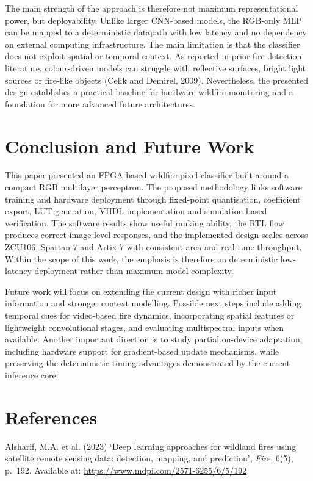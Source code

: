 \documentclass[11pt,a4paper]{article}
\begin{document}
The main strength of the approach is therefore not maximum representational power, but deployability. Unlike larger CNN-based models, the RGB-only MLP can be mapped to a deterministic datapath with low latency and no dependency on external computing infrastructure. The main limitation is that the classifier does not exploit spatial or temporal context. As reported in prior fire-detection literature, colour-driven models can struggle with reflective surfaces, bright light sources or fire-like objects (Celik and Demirel, 2009). Nevertheless, the presented design establishes a practical baseline for hardware wildfire monitoring and a foundation for more advanced future architectures.

\section{Conclusion and Future Work}

This paper presented an FPGA-based wildfire pixel classifier built around a compact RGB multilayer perceptron. The proposed methodology links software training and hardware deployment through fixed-point quantisation, coefficient export, LUT generation, VHDL implementation and simulation-based verification. The software results show useful ranking ability, the RTL flow produces correct image-level responses, and the implemented design scales across ZCU106, Spartan-7 and Artix-7 with consistent area and real-time throughput. Within the scope of this work, the emphasis is therefore on deterministic low-latency deployment rather than maximum model complexity.

Future work will focus on extending the current design with richer input information and stronger context modelling. Possible next steps include adding temporal cues for video-based fire dynamics, incorporating spatial features or lightweight convolutional stages, and evaluating multispectral inputs when available. Another important direction is to study partial on-device adaptation, including hardware support for gradient-based update mechanisms, while preserving the deterministic timing advantages demonstrated by the current inference core.

\section*{References}

Alsharif, M.A. et al. (2023) `Deep learning approaches for wildland fires using satellite remote sensing data: detection, mapping, and prediction', \textit{Fire}, 6(5), p.~192. Available at: \url{https://www.mdpi.com/2571-6255/6/5/192}.
\end{document}
